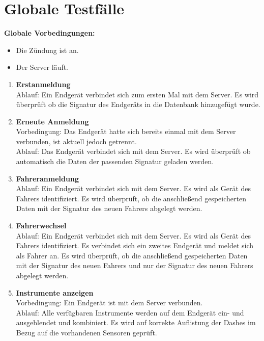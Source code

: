 \documentclass[pflichtenheft.tex]{subfiles}
\begin{document}
\chapter{Globale Testfälle}

\renewcommand{\theenumi}{/GT\ifnum \value{enumi}<10 0\fi\arabic{enumi}0/}
\renewcommand{\labelenumi}{\theenumi}
\renewcommand{\theenumii}{\arabic{enumii}}
\renewcommand{\labelenumii}{GT\ifnum \value{enumi}<10 0\fi\arabic{enumi}\arabic{enumii}/}

\textbf{Globale Vorbedingungen:}
\begin{itemize}
\item
Die Zündung ist an.
\item
Der Server läuft.
\end{itemize}

\begin{enumerate}

\item{\textbf{Erstanmeldung}} \label{firstLoginT} \\ 
Ablauf: Ein Endgerät verbindet sich zum ersten Mal mit dem Server. Es wird überprüft ob die Signatur des Endgeräts in die Datenbank hinzugefügt wurde.

\item{\textbf{Erneute Anmeldung}} \label{repLoginT} \\
Vorbedingung: Das Endgerät hatte sich bereits einmal mit dem Server verbunden, ist aktuell jedoch getrennt.\\
Ablauf: Das Endgerät verbindet sich mit dem Server. Es wird überprüft ob automatisch die Daten der passenden Signatur geladen werden.

\item{\textbf{Fahreranmeldung}} \label{regDriverT} \\
Ablauf: Ein Endgerät verbindet sich mit dem Server. Es wird als Gerät des Fahrers identifiziert. Es wird überprüft, ob die anschließend gespeicherten Daten mit der Signatur des neuen Fahrers abgelegt werden.

\item{\textbf{Fahrerwechsel}} \label{changeDriverT} \\
Ablauf: Ein Endgerät verbindet sich mit dem Server. Es wird als Gerät des Fahrers identifiziert. Es verbindet sich ein zweites Endgerät und meldet sich als Fahrer an. Es wird überprüft, ob die anschließend gespeicherten Daten mit der Signatur des neuen Fahrers und nur der Signatur des neuen Fahrers abgelegt werden.

\item{\textbf{Instrumente anzeigen}} \label{showDashesT} \\
Vorbedingung: Ein Endgerät ist mit dem Server verbunden. \\
Ablauf: Alle verfügbaren Instrumente werden auf dem Endgerät ein- und ausgeblendet und kombiniert. Es wird auf korrekte Auflistung der Dashes im Bezug auf die vorhandenen Sensoren geprüft.


\end{enumerate}
\end{document}
